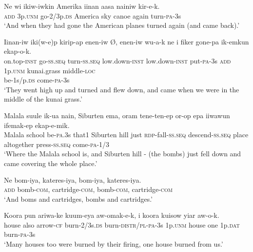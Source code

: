 {\ea\label{ex:a:x66}
\gll  Ne  wi  ikiw-iwkin  Amerika  iinan  aasa  nainiw  kir-e-k. \\
\textsc{add}  3p.\textsc{unm}  go-2/3p.\textsc{ds}  America  sky  canoe  again  turn-\textsc{pa}-3s \\
\glt ‘And when they had gone the American planes turned again (and came back).’ \\
\z


\ea\label{ex:a:x67}
\gll  Iinan-iw  iki(w-e)p  kirip-ap  enen-iw  Ø, enen-iw  wu-a-k  ne  i  fiker  gone-pa  ik-emkun  ekap-o-k. \\
on.top-\textsc{inst}  go-\textsc{ss.seq}  turn-\textsc{ss.seq}  low.down-\textsc{inst}   low.down-\textsc{inst}  put-\textsc{pa}-3s  \textsc{add}  1p.\textsc{unm}  kunai.grass  middle-\textsc{loc} \\
be-1s/p.\textsc{ds}  come-\textsc{pa}-3s \\
\glt ‘They went high up and turned and flew down, and came when we were in the middle of the kunai grass.’ \\
\z


\ea\label{ex:a:x68}
\gll  Malala  suule  ik-ua  nain,  Siburten  ema,  oram  tene-ten-ep  or-op  epa  iiwawun  ifemak-ep  ekap-e-mik. \\
Malala  school  be-\textsc{pa}.3s  that1  Siburten  hill  just  \textsc{rdp}-fall-\textsc{ss.seq} descend-\textsc{ss.seq}  place  altogether  press-\textsc{ss.seq}  come-\textsc{pa}-1/3 \\
\glt ‘Where the Malala school is, and Siburten hill - (the bombs) just fell down and came covering the whole place.’ \\
\z


\ea\label{ex:a:x69}
\gll  Ne  bom-iya,  kateres-iya,  bom-iya,  kateres-iya. \\
\textsc{add}  bomb-\textsc{com},  cartridge-\textsc{com},  bomb-\textsc{com},  cartridge-\textsc{com} \\
\glt ‘And boms and cartridges, bombs and cartridges.’ \\
\z


\ea\label{ex:a:x70}
\gll  Koora  pun  ariwa-ke  kuum-eya  aw-omak-e-k,  i  koora  kuisow  yiar  aw-o-k. \\
house  also  arrow-\textsc{cf}  burn-2/3s.\textsc{ds}  burn-\textsc{distr}/\textsc{pl}-\textsc{pa}-3s 1p.\textsc{unm}  house  one  1p.\textsc{dat}  burn-\textsc{pa}-3s \\
\glt ‘Many houses too were burned by their firing, one house burned from us.’ \\
\z


}
